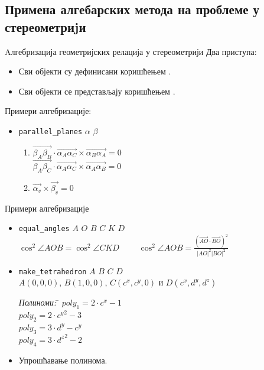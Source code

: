 \documentclass[slidestop, compress, mathserif, containsverbatim, xcolor=dvipsnames]{beamer}
\begin{document}
\subsection*{Примена алгебарских метода на проблеме у стереометриjи}

\begin{frame}{Aлгебризација геометријских релација у стереометрији}
  Два приступа:
  \begin{itemize}
  \item Сви објекти су дефинисани коришћењем .
  \item Сви објекти се представљају коришћењем .
  \end{itemize}
  \vspace{1cm}
  Примери алгебризације:
  \begin{itemize}
  \item {\tt parallel\_planes} $\alpha$ $\beta$
  \begin{enumerate}
   \item $\overrightarrow{\beta_A\beta_B}\cdot \overrightarrow{\alpha_A\alpha_C} \times \overrightarrow{\alpha_B\alpha_A} = 0$ \\
         $\overrightarrow{\beta_A\beta_C}\cdot \overrightarrow{\alpha_A\alpha_C} \times \overrightarrow{\alpha_A\alpha_B} = 0$ \vfill
   \item $\overrightarrow{\alpha_v} \times \overrightarrow{\beta_v} = 0$
  \end{enumerate}
  \end{itemize}
\end{frame}

\begin{frame}{Примери алгебризације}
  \begin{itemize}
  \item {\tt equal\_angles} $A$ $O$ $B$ $C$ $K$ $D$ \\
     $\cos^2{\angle AOB} = \cos^2{\angle CKD}$ \ \ \ \ 
     $\cos^2{\angle AOB} = \frac{(\overrightarrow{AO}\cdot \overrightarrow{BO})^2}{|AO|^2|BO|^2}$ \vfill
  \item {\tt make\_tetrahedron} $A$ $B$ $C$ $D$ \\
        $A(0, 0, 0)$, $B(1, 0, 0)$, $C(c^x, c^y, 0)$ и $D(c^x, d^y, d^z)$ 
        \begin{tabbing}
          {\em Полиноми:} \= $poly_1 = 2\cdot c^x - 1$ \\
          \> $poly_2 = 2\cdot {c^y}^2 - 3$ \\
          \> $poly_3 = 3\cdot d^y - c^y$ \\
          \> $poly_4 = 3\cdot {d^z}^2 - 2$
        \end{tabbing} \vfill
  \item Упрошћавање полинома.
  \end{itemize}
\end{frame}
\end{document}
